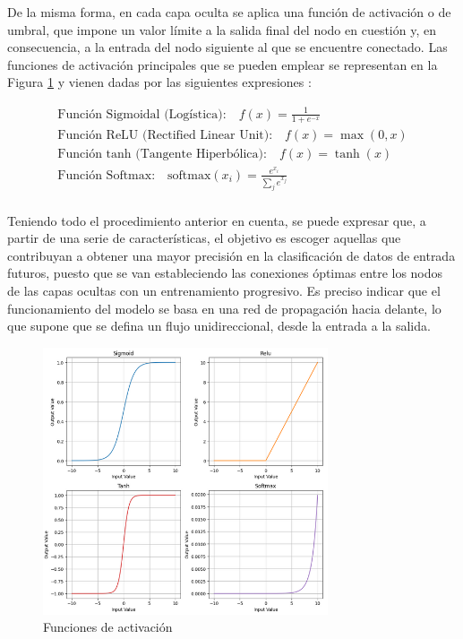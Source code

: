 \vspace{3mm}

De la misma forma, en cada capa oculta se aplica una función de activación o de umbral, que impone un valor límite a la salida final del nodo en cuestión y, en consecuencia, a la entrada del nodo siguiente al que se encuentre conectado. Las funciones de activación principales que se pueden emplear se representan en la Figura \ref{fig:functions} y vienen dadas por las siguientes expresiones \cite{factiv} \cite{functions}:

\begin{equation}
    \begin{aligned}
        \text{Función Sigmoidal (Logística):} \quad f(x) = \frac{1}{1 + e^{-x}} \\
        \text{Función ReLU (Rectified Linear Unit):} \quad f(x) = \max(0, x) \\
        \text{Función tanh (Tangente Hiperbólica):} \quad f(x) = \tanh(x) \\
        \text{Función Softmax:} \quad \text{softmax}(x_i) = \frac{e^{x_i}}{\sum_{j} e^{x_j}} \\
    \end{aligned}
\end{equation}

\pagebreak

Teniendo todo el procedimiento anterior en cuenta, se puede expresar que, a partir de una serie de características, el objetivo es escoger aquellas que contribuyan a obtener una mayor precisión en la clasificación de datos de entrada futuros, puesto que se van estableciendo las conexiones óptimas entre los nodos de las capas ocultas con un entrenamiento progresivo. Es preciso indicar que el funcionamiento del modelo se basa en una red de propagación hacia delante, lo que supone que se defina un flujo unidireccional, desde la entrada a la salida. 

\vspace{3mm}

\begin{figure}[h!]
    \centering
    \includegraphics[width=0.75\textwidth]{img/teoria/functions.png}
    \caption{Funciones de activación \cite{functions}}
    \label{fig:functions}
\end{figure}

